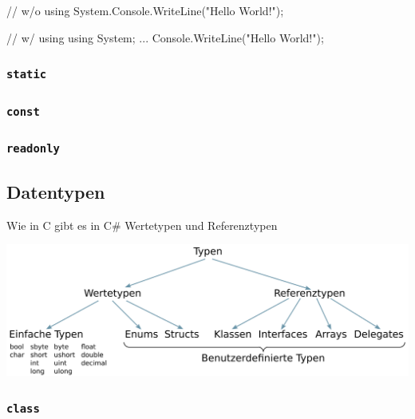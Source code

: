 \documentclass[
  letterpaper,
  DIV=11,
  numbers=noendperiod]{scrartcl}
\newenvironment{Shaded}{\begin{snugshade}}{\end{snugshade}}
\newcommand{\CommentTok}[1]{\textcolor[rgb]{0.37,0.37,0.37}{#1}}
\newcommand{\FunctionTok}[1]{\textcolor[rgb]{0.28,0.35,0.67}{#1}}
\newcommand{\KeywordTok}[1]{\textcolor[rgb]{0.00,0.23,0.31}{#1}}
\newcommand{\NormalTok}[1]{\textcolor[rgb]{0.00,0.23,0.31}{#1}}
\newcommand{\OperatorTok}[1]{\textcolor[rgb]{0.37,0.37,0.37}{#1}}
\newcommand{\StringTok}[1]{\textcolor[rgb]{0.13,0.47,0.30}{#1}}
\begin{document}
\begin{multicols}{2}
\begin{Shaded}
\begin{Highlighting}[]
\CommentTok{// w/o \textasciigrave{}using\textasciigrave{}}
\NormalTok{System}\OperatorTok{.}\FunctionTok{Console}\OperatorTok{.}\FunctionTok{WriteLine}\OperatorTok{(}\StringTok{"Hello World!"}\OperatorTok{);}

\CommentTok{// w/ \textasciigrave{}using\textasciigrave{}}
\KeywordTok{using}\NormalTok{ System}\OperatorTok{;}
\OperatorTok{...}
\NormalTok{Console}\OperatorTok{.}\FunctionTok{WriteLine}\OperatorTok{(}\StringTok{"Hello World!"}\OperatorTok{);}
\end{Highlighting}
\end{Shaded}

\hypertarget{static}{%
\subsubsection{\texorpdfstring{\texttt{static}}{static}}\label{static}}

\hypertarget{const}{%
\subsubsection{\texorpdfstring{\texttt{const}}{const}}\label{const}}

\hypertarget{readonly}{%
\subsubsection{\texorpdfstring{\texttt{readonly}}{readonly}}\label{readonly}}

\hypertarget{datentypen}{%
\subsection{Datentypen}\label{datentypen}}

Wie in C gibt es in C\# Wertetypen und Referenztypen

\includegraphics{images/Types.png}

\hypertarget{class}{%
\subsubsection{\texorpdfstring{\texttt{class}}{class}}\label{class}}


\end{multicols}
\end{document}
